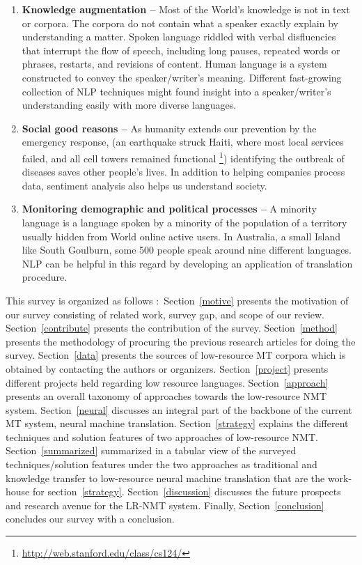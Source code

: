 \documentclass[manuscript,screen]{acmart}
\begin{document}
\begin{enumerate}
\item \textbf{Knowledge augmentation --}
Most of the World's knowledge is not in text or corpora. The corpora do not contain what a speaker exactly explain by understanding a matter. Spoken language riddled with verbal disfluencies that interrupt the flow of speech, including long pauses, repeated words or phrases, restarts, and revisions of content. Human language is a system constructed to convey the speaker/writer's meaning. Different fast-growing collection of NLP techniques might found insight into a speaker/writer's understanding easily with more diverse languages.
\item \textbf{Social good reasons --}
As humanity extends our prevention by the emergency response, (an earthquake struck Haiti, where most local services failed, and all cell towers remained functional \footnote{ \url{http://web.stanford.edu/class/cs124/}}) identifying the outbreak of diseases saves other people's lives. In addition to helping companies process data, sentiment analysis also helps us understand society.
\item \textbf{Monitoring demographic and political processes --}
A minority language is a language spoken by a minority of the population of a territory usually hidden from World online active users. In Australia, a  small Island like South Goulburn, some 500 people speak around nine different languages. NLP can be helpful in this regard by developing an application of translation procedure. 
\end{enumerate}

This survey is organized as follows $\colon$  Section~\ref{motive} presents the motivation of our survey consisting of related work, survey gap, and scope of our review.  Section~\ref{contribute} presents the contribution of the survey. Section~\ref{method} presents the methodology of procuring the previous research articles for doing the survey. Section~\ref{data} presents the sources of low-resource MT corpora which is obtained by contacting the authors or organizers. Section~\ref{project} presents different projects held regarding low resource languages. Section~\ref{approach} presents an overall taxonomy of approaches towards the low-resource NMT system. 
Section~\ref{neural} discusses an integral part of the backbone of the current MT system, neural machine translation. 
Section~\ref{strategy} explains the different techniques and solution features of two approaches of low-resource NMT.  
Section~\ref{summarized} summarized in a tabular view of the surveyed techniques/solution features under the two approaches as traditional and knowledge transfer to low-resource neural machine translation that are the work-house for section~\ref{strategy}.
Section~\ref{discussion} discusses the future prospects and research avenue for the LR-NMT system. Finally, Section~\ref{conclusion} concludes our survey with a conclusion.
\end{document}
